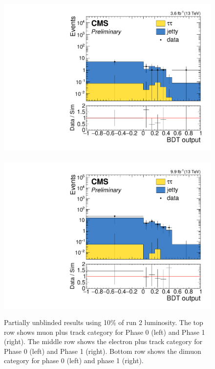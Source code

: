 \begin{figure}[!htb]
\includegraphics[width=0.48\linewidth]{plots/partial_unblinded_dimuon/sos_final_dilepBDTphase1CorrJetNoMultIso10Dr0.6_log.pdf} \,
\includegraphics[width=0.48\linewidth]{plots/partial_unblinded_dimuon_phase1/sos_final_dilepBDTCorrJetNoMultIso10Dr0.6_log.pdf} \\

\caption[Partially unblinded results]{Partially unblinded results using 10\% of run 2 luminosity. The top row shows muon plus track category for Phase 0 (left) and Phase 1 (right). The middle row shows the electron plus track category for Phase 0 (left) and Phase 1 (right). Bottom row shows the dimuon category for phase 0 (left) and phase 1 (right).}
\label{fig:unblinded_results}
\end{figure}

